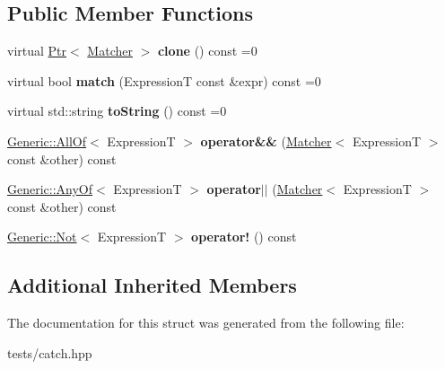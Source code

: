\subsection*{Public Member Functions}
\begin{DoxyCompactItemize}
\item 
\mbox{\label{struct_catch_1_1_matchers_1_1_impl_1_1_matcher_a9d31e5018fea24efa08c3cbf5aa4475d}} 
virtual \hyperlink{class_catch_1_1_ptr}{Ptr}$<$ \hyperlink{struct_catch_1_1_matchers_1_1_impl_1_1_matcher}{Matcher} $>$ {\bfseries clone} () const =0
\item 
\mbox{\label{struct_catch_1_1_matchers_1_1_impl_1_1_matcher_a8c1c5511ce1f3738a45e6901b558f583}} 
virtual bool {\bfseries match} (ExpressionT const \&expr) const =0
\item 
\mbox{\label{struct_catch_1_1_matchers_1_1_impl_1_1_matcher_a091bcc37e589967d7e10fc7790d820e2}} 
virtual std\+::string {\bfseries to\+String} () const =0
\item 
\mbox{\label{struct_catch_1_1_matchers_1_1_impl_1_1_matcher_adb060f348e3ed404b80209fbc62174e1}} 
\hyperlink{class_catch_1_1_matchers_1_1_impl_1_1_generic_1_1_all_of}{Generic\+::\+All\+Of}$<$ ExpressionT $>$ {\bfseries operator\&\&} (\hyperlink{struct_catch_1_1_matchers_1_1_impl_1_1_matcher}{Matcher}$<$ ExpressionT $>$ const \&other) const
\item 
\mbox{\label{struct_catch_1_1_matchers_1_1_impl_1_1_matcher_a55b1e12315e7a5daf7ce7a11ddfaa295}} 
\hyperlink{class_catch_1_1_matchers_1_1_impl_1_1_generic_1_1_any_of}{Generic\+::\+Any\+Of}$<$ ExpressionT $>$ {\bfseries operator$\vert$$\vert$} (\hyperlink{struct_catch_1_1_matchers_1_1_impl_1_1_matcher}{Matcher}$<$ ExpressionT $>$ const \&other) const
\item 
\mbox{\label{struct_catch_1_1_matchers_1_1_impl_1_1_matcher_a7ecd56842090611c9dbfc325b42fa942}} 
\hyperlink{class_catch_1_1_matchers_1_1_impl_1_1_generic_1_1_not}{Generic\+::\+Not}$<$ ExpressionT $>$ {\bfseries operator!} () const
\end{DoxyCompactItemize}
\subsection*{Additional Inherited Members}


The documentation for this struct was generated from the following file\+:\begin{DoxyCompactItemize}
\item 
tests/catch.\+hpp\end{DoxyCompactItemize}
